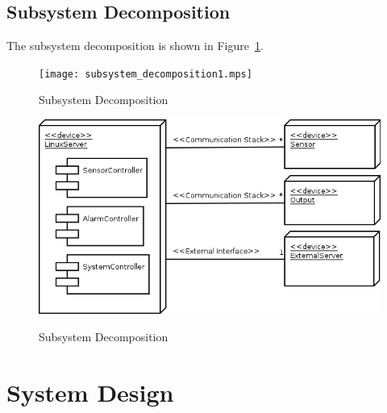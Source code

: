 \documentclass{report}
\begin{document}

\section{Subsystem Decomposition}



The subsystem decomposition is shown in Figure~\ref{fig:subsystem_decomposition}.

\begin{figure}[hp]
    \centering
        \caption{Subsystem Decomposition}
        \scriptsize
        \setlength{\unitlength}{2.0em}
        \texttt{[image: subsystem\_decomposition1.mps]}
        \normalsize
    \label{fig:subsystem_decomposition}
\end{figure}

\begin{figure}[hp]
  \centering
  \caption{Subsystem Decomposition}
  \includegraphics[scale=0.5]{deployment.png}
  \label{fig:subsystem_deployment}
\end{figure}

\chapter{System Design} %
\label{ch:system-design}
\end{document}
